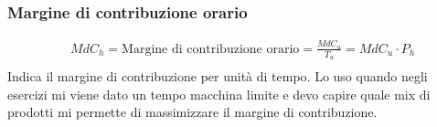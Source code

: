 \documentclass{article}
\begin{document}
\subsubsection*{Margine di contribuzione orario}
\begin{align*}
     & MdC_h = \text{Margine di contribuzione orario} = \displaystyle\frac{MdC_{u}}{T_{u}} = MdC_u \cdot P_h \\
\end{align*}
Indica il margine di contribuzione per unità di tempo.
Lo uso quando negli esercizi mi viene dato un tempo macchina limite e devo capire quale mix di prodotti mi permette di massimizzare il margine di contribuzione.
\begin{table}[H]
    \setlength{\extrarowheight}{12pt}
\end{table}
\end{document}
